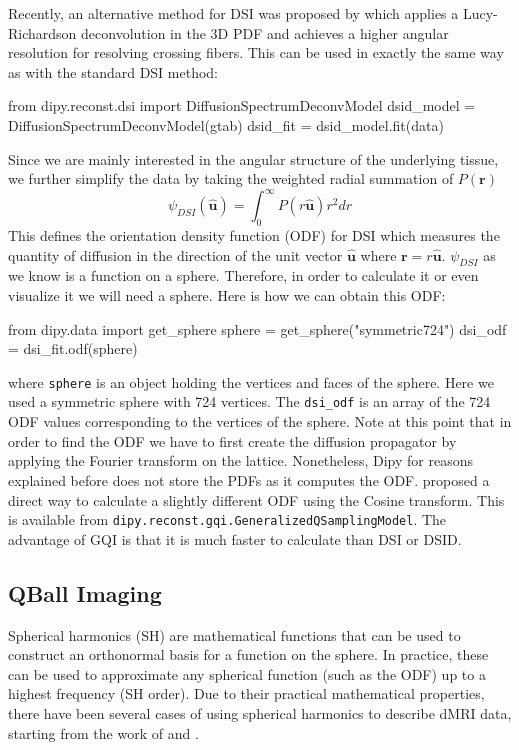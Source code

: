 \documentclass{bioinfo}
\begin{document}
Recently, an alternative method for DSI was proposed by \citep{canales-rodriguez-etal:10} which applies a Lucy-Richardson deconvolution in the 3D PDF and achieves a higher angular resolution for resolving crossing fibers. This can be used in exactly the same way as with the standard DSI method:
\begin{python}
from dipy.reconst.dsi import
                      DiffusionSpectrumDeconvModel
dsid_model = DiffusionSpectrumDeconvModel(gtab)
dsid_fit = dsid_model.fit(data)
\end{python}
Since we are mainly interested in the angular structure of the underlying tissue, we further simplify the data by taking the weighted radial summation of $P(\mathbf{r})$
\begin{equation}
\psi_{DSI}(\hat{\mathbf{u}})=\int_{0}^{\infty}P(r\hat{\mathbf{u}})r^{2}dr\label{eq:ODF_DSI}
\end{equation}
\noindent This defines the orientation density function (ODF) for DSI which measures the quantity of diffusion in the direction of the unit vector $\mathbf{\hat{u}}$ where $\mathbf{r=}r\hat{\mathbf{u}}$. $\psi_{DSI}$ as we know is a function on a sphere. Therefore, in order to calculate it or even visualize it we will need a sphere. Here is how we can obtain this ODF:
\begin{python}
from dipy.data import get_sphere
sphere = get_sphere("symmetric724")
dsi_odf = dsi_fit.odf(sphere)
\end{python}
where \texttt{sphere} is an object holding the vertices and faces of the sphere. Here we used a symmetric sphere with 724 vertices. The \texttt{dsi\_odf} is an array of the 724 ODF values corresponding to the vertices of the sphere. Note at this point that in order to find the ODF we have to first create the diffusion propagator by applying the Fourier transform on the lattice. Nonetheless, Dipy for reasons explained before does not store the PDFs as it computes the ODF. \cite{yeh-etal:10} proposed a direct way to calculate a slightly different ODF using the Cosine transform. This is available from \texttt{dipy.reconst.gqi.GeneralizedQSamplingModel}. The advantage of GQI is that it is much faster to calculate than DSI or DSID.

\subsection{QBall Imaging}

Spherical harmonics (SH) are mathematical functions that can be used to construct an orthonormal basis for a function on the sphere. In practice, these can be used to approximate any spherical function (such as the ODF) up to a highest frequency (SH order). Due to their practical mathematical properties, there have been several cases of using spherical harmonics to describe dMRI data, starting from the work of \citet{Frank2001, Frank2002} and \citet{tuch-reese-etal:02}.
\end{document}
